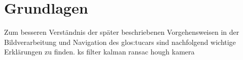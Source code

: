 \chapter{Grundlagen}
Zum besseren Verständnis der später beschriebenen Vorgehensweisen in der Bildverarbeitung und Navigation des \gls{glos:tucar}s sind nachfolgend wichtige Erklärungen zu finden.
{ks}
{filter}
{kalman}
{ransac}
{hough}
{kamera}
